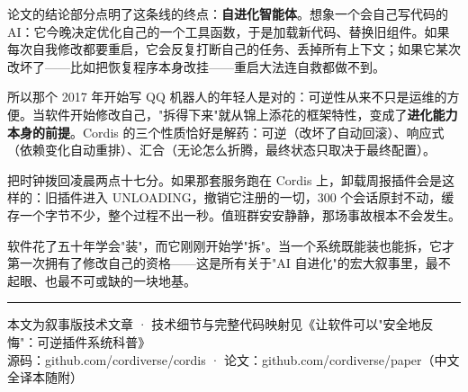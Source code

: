 \documentclass[11pt,a4paper]{article}
\begin{document}
论文的结论部分点明了这条线的终点：\textbf{自进化智能体}。想象一个会自己写代码的 AI：它今晚决定优化自己的一个工具函数，于是加载新代码、替换旧组件。如果每次自我修改都要重启，它会反复打断自己的任务、丢掉所有上下文；如果它某次改坏了——比如把恢复程序本身改挂——重启大法连自救都做不到。

所以那个 2017 年开始写 QQ 机器人的年轻人是对的：可逆性从来不只是运维的方便。当软件开始修改自己，"拆得下来"就从锦上添花的框架特性，变成了\textbf{进化能力本身的前提}。Cordis 的三个性质恰好是解药：可逆（改坏了自动回滚）、响应式（依赖变化自动重排）、汇合（无论怎么折腾，最终状态只取决于最终配置）。

把时钟拨回凌晨两点十七分。如果那套服务跑在 Cordis 上，卸载周报插件会是这样的：旧插件进入 UNLOADING，撤销它注册的一切，300 个会话原封不动，缓存一个字节不少，整个过程不出一秒。值班群安安静静，那场事故根本不会发生。

软件花了五十年学会"装"，而它刚刚开始学"拆"。当一个系统既能装也能拆，它才第一次拥有了修改自己的资格——这是所有关于"AI 自进化"的宏大叙事里，最不起眼、也最不可或缺的一块地基。

\vspace{1em}
\rule{\textwidth}{0.4pt}
\vspace{0.6em}

\begin{center}
\footnotesize\color{auxgray}
本文为叙事版技术文章 · 技术细节与完整代码映射见《让软件可以"安全地反悔"：可逆插件系统科普》\\
源码：github.com/cordiverse/cordis · 论文：github.com/cordiverse/paper（中文全译本随附）
\end{center}
\end{document}

